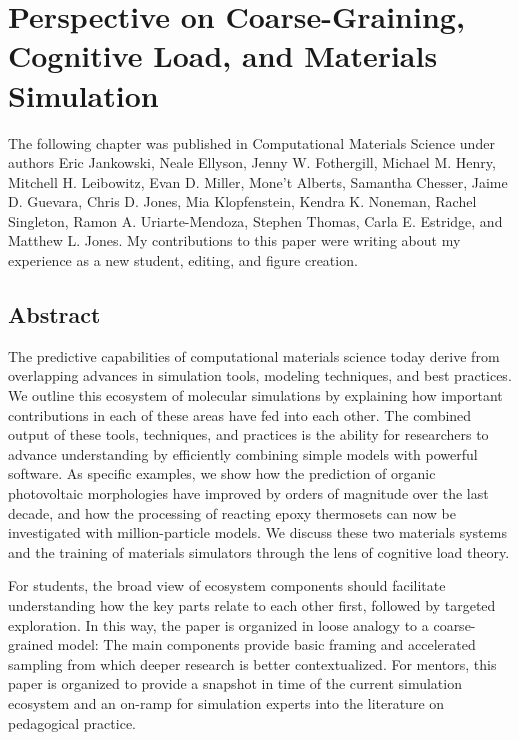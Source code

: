 \chapter{Perspective on Coarse-Graining, Cognitive Load, and Materials Simulation}
\label{chap:perspective}

The following chapter was published in Computational Materials Science under authors Eric Jankowski, Neale Ellyson, Jenny W. Fothergill, Michael M. Henry, Mitchell H. Leibowitz, Evan D. Miller, Mone't Alberts, Samantha Chesser, Jaime D. Guevara, Chris D. Jones, Mia Klopfenstein, Kendra K. Noneman, Rachel Singleton, Ramon A. Uriarte-Mendoza, Stephen Thomas, Carla E. Estridge, and Matthew L. Jones. My contributions to this paper were writing about my experience as a new student, editing, and figure creation.

\section{Abstract}
The predictive capabilities of computational materials science today derive from overlapping advances in simulation tools, modeling techniques, and best practices.
We outline this ecosystem of molecular simulations by explaining how important contributions in each of these areas have fed into each other.
The combined output of these tools, techniques, and practices is the ability for researchers to advance understanding by efficiently combining simple models with powerful software.
As specific examples, we show how the prediction of organic photovoltaic morphologies have improved by orders of magnitude over the last decade, and how the processing of reacting epoxy thermosets can now be investigated with million-particle models.
We discuss these two materials systems and the training of materials simulators through the lens of cognitive load theory.

For students, the broad view of ecosystem components should facilitate understanding how the key parts relate to each other first, followed by targeted exploration.
In this way, the paper is organized in loose analogy to a coarse-grained model: The main components provide basic framing and accelerated sampling from which deeper research is better contextualized. 
For mentors, this paper is organized to provide a snapshot in time of the current simulation ecosystem and an on-ramp for simulation experts into the literature on pedagogical practice.

